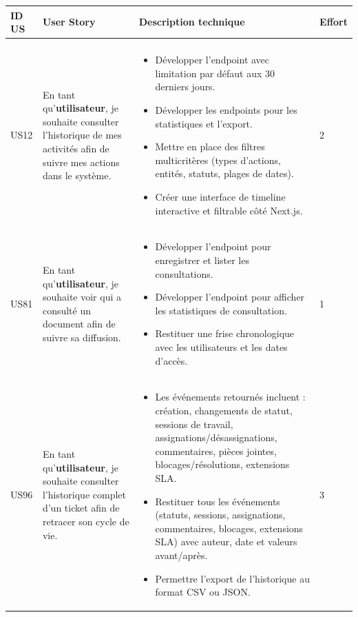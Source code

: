 ﻿
\renewcommand{\arraystretch}{1.3}
\small
\begin{longtable}{|C{1cm}|L{5.6cm}|L{8cm}|C{0.85cm}|}
\hline
\textbf{ID US} & \textbf{User Story} & \textbf{Description technique} & \textbf{Effort} \\
\hline
\endfirsthead

    \hline

\endhead

\hline
\endfoot

\hline
\endlastfoot

 \\
\hline
US12 & En tant qu'\textbf{utilisateur}, je souhaite consulter l'historique de mes activités afin de suivre mes actions dans le système. &
\begin{itemize}[nosep, left=0pt, label={$\bullet$}]
\item Développer l'endpoint avec limitation par défaut aux 30 derniers jours.
\item Développer les endpoints pour les statistiques et l'export.
\item Mettre en place des filtres multicritères (types d'actions, entités, statuts, plages de dates).
\item Créer une interface de timeline interactive et filtrable côté Next.js.
\end{itemize} & 2 \\
\hline
US81 & En tant qu'\textbf{utilisateur}, je souhaite voir qui a consulté un document afin de suivre sa diffusion. &
\begin{itemize}[nosep, left=0pt, label={$\bullet$}]
\item  Développer l'endpoint pour enregistrer et lister les consultations.
\item  Développer l'endpoint pour afficher les statistiques de consultation.
\item Restituer une frise chronologique avec les utilisateurs et les dates d'accès.
\end{itemize} & 1 \\
\hline
US96 & En tant qu'\textbf{utilisateur}, je souhaite consulter l'historique complet d'un ticket afin de retracer son cycle de vie. &
\begin{itemize}[nosep, left=0pt, label={$\bullet$}]
\item Les événements retournés incluent : création, changements de statut, sessions de travail, assignations/désassignations, commentaires, pièces jointes, blocages/résolutions, extensions SLA.
\item Restituer tous les événements (statuts, sessions, assignations, commentaires, blocages, extensions SLA) avec auteur, date et valeurs avant/après.
\item Permettre l'export de l'historique au format CSV ou JSON.
\end{itemize} & 3 \\
\hline


\end{longtable}
